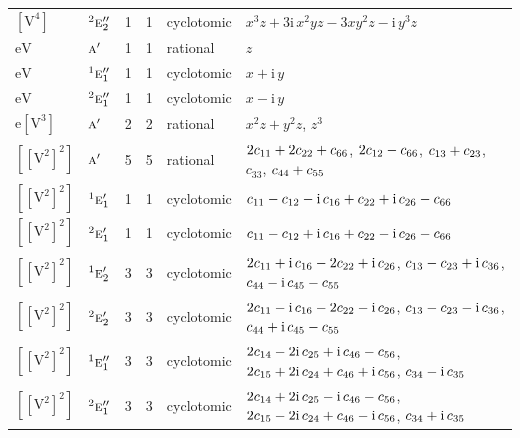 \documentclass[10pt,a4paper]{article}
\numberwithin{equation}{section}
\newcommand{\irr}[1]{\text{\normalfont\scshape #1}}
\newcommand{\conjpair}[1]{{}^{#1}}
\newcommand{\iunit}{\mathrm{i}}
\newcommand{\jahn}[1]{\mathrm{#1}}
\newlength{\fillwidth}\newlength{\cellwidth}\newlength{\colwidth}
\newcommand{\signbreak}{\penalty100\relax}
\begin{document}
{\begin{longtable}{@{}llrrl>{\RaggedRight\arraybackslash}p{\fillwidth}@{}}
$\jahn{[V^{4}]}$ & $\conjpair{2}\irr{e}_{2}''$ & 1 & 1 & cyclotomic & $x^{3}z + 3\iunit{}\,x^{2}yz - 3xy^{2}z - \iunit{}\,y^{3}z$\\
$\jahn{eV}$ & $\irr{a}'$ & 1 & 1 & rational & $z$\\
$\jahn{eV}$ & $\conjpair{1}\irr{e}_{1}''$ & 1 & 1 & cyclotomic & $x + \iunit{}\,y$\\
$\jahn{eV}$ & $\conjpair{2}\irr{e}_{1}''$ & 1 & 1 & cyclotomic & $x - \iunit{}\,y$\\
$\jahn{e[V^{3}]}$ & $\irr{a}'$ & 2 & 2 & rational & $x^{2}z + y^{2}z$, $z^{3}$\\
$\jahn{[[V^{2}]^{2}]}$ & $\irr{a}'$ & 5 & 5 & rational & $2c_{11} +\signbreak 2c_{22} +\signbreak c_{66}$, $2c_{12} -\signbreak c_{66}$, $c_{13} +\signbreak c_{23}$, $c_{33}$, $c_{44} +\signbreak c_{55}$\\
$\jahn{[[V^{2}]^{2}]}$ & $\conjpair{1}\irr{e}_{1}'$ & 1 & 1 & cyclotomic & $c_{11} -\signbreak c_{12} -\signbreak \iunit{}\,c_{16} +\signbreak c_{22} +\signbreak \iunit{}\,c_{26} -\signbreak c_{66}$\\
$\jahn{[[V^{2}]^{2}]}$ & $\conjpair{2}\irr{e}_{1}'$ & 1 & 1 & cyclotomic & $c_{11} -\signbreak c_{12} +\signbreak \iunit{}\,c_{16} +\signbreak c_{22} -\signbreak \iunit{}\,c_{26} -\signbreak c_{66}$\\
$\jahn{[[V^{2}]^{2}]}$ & $\conjpair{1}\irr{e}_{2}'$ & 3 & 3 & cyclotomic & $2c_{11} +\signbreak \iunit{}\,c_{16} -\signbreak 2c_{22} +\signbreak \iunit{}\,c_{26}$, $c_{13} -\signbreak c_{23} +\signbreak \iunit{}\,c_{36}$, $c_{44} -\signbreak \iunit{}\,c_{45} -\signbreak c_{55}$\\
$\jahn{[[V^{2}]^{2}]}$ & $\conjpair{2}\irr{e}_{2}'$ & 3 & 3 & cyclotomic & $2c_{11} -\signbreak \iunit{}\,c_{16} -\signbreak 2c_{22} -\signbreak \iunit{}\,c_{26}$, $c_{13} -\signbreak c_{23} -\signbreak \iunit{}\,c_{36}$, $c_{44} +\signbreak \iunit{}\,c_{45} -\signbreak c_{55}$\\
$\jahn{[[V^{2}]^{2}]}$ & $\conjpair{1}\irr{e}_{1}''$ & 3 & 3 & cyclotomic & $2c_{14} -\signbreak 2\iunit{}\,c_{25} +\signbreak \iunit{}\,c_{46} -\signbreak c_{56}$, $2c_{15} +\signbreak 2\iunit{}\,c_{24} +\signbreak c_{46} +\signbreak \iunit{}\,c_{56}$, $c_{34} -\signbreak \iunit{}\,c_{35}$\\
$\jahn{[[V^{2}]^{2}]}$ & $\conjpair{2}\irr{e}_{1}''$ & 3 & 3 & cyclotomic & $2c_{14} +\signbreak 2\iunit{}\,c_{25} -\signbreak \iunit{}\,c_{46} -\signbreak c_{56}$, $2c_{15} -\signbreak 2\iunit{}\,c_{24} +\signbreak c_{46} -\signbreak \iunit{}\,c_{56}$, $c_{34} +\signbreak \iunit{}\,c_{35}$\\

\end{longtable}}
\end{document}
